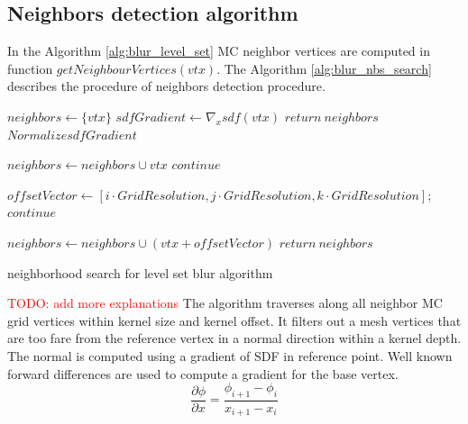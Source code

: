  \subsection{Neighbors detection algorithm}
In the Algorithm \ref{alg:blur_level_set} MC neighbor vertices are computed in function $getNeighbourVertices(vtx)$. The Algorithm \ref{alg:blur_nbs_search} describes the procedure of neighbors detection procedure.
\begin{algorithm}[H]
	\scriptsize
	\begin{algorithmic}
		\State $neighbors \gets \{vtx\}$
		\State $sdfGradient \gets \nabla_x sdf(vtx)$
			\State $return\ neighbors$
		\EndIf
		\State $Normalize sdfGradient$
		
						\State $neighbors \gets neighbors \cup vtx$
						\State $continue$
					\EndIf
					
					\State $offsetVector \gets [i \cdot GridResolution, j \cdot GridResolution, k \cdot GridResolution]$;
						\State $continue$
					\EndIf
					
					\State $neighbors \gets neighbors \cup (vtx + offsetVector)$
				\EndFor
			\EndFor
		\EndFor
		\State $return\ neighbors$
	\end{algorithmic}
	\caption{neighborhood search for level set blur algorithm}
	\label{alg:blur_nbs_search}
\end{algorithm}
\textcolor{red}{TODO: add more explanations}
The algorithm traverses along all neighbor MC grid vertices within kernel size and kernel offset. It filters out a mesh vertices that are too fare from the reference vertex in a normal direction within a kernel depth. The normal is computed using a gradient of SDF in reference point. Well known forward differences are used to compute a gradient for the base vertex.
\begin{equation}
	\dfrac{\partial \phi}{\partial x} = \dfrac{\phi_{i+1} - \phi_i}{x_{i+1} - x_i}
\end{equation}
